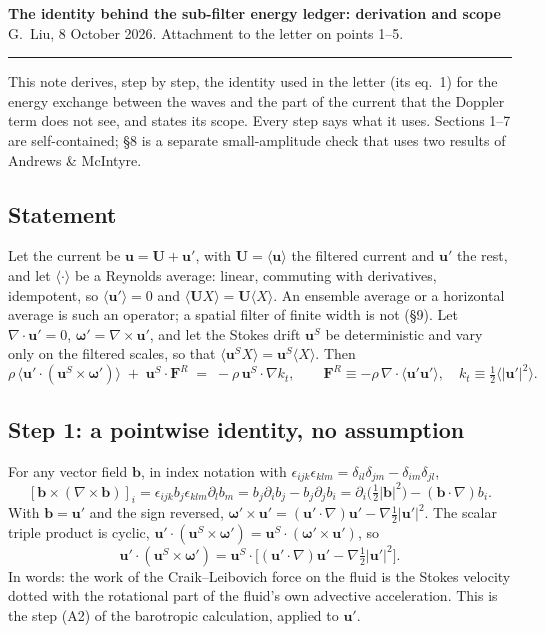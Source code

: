\documentclass[10pt]{article}
\newcommand{\av}[1]{\langle #1\rangle}\newcommand{\uS}{\bm u^S}\newcommand{\WS}{\mathcal W_S}\newcommand{\PS}{\mathcal P_S}
\newcommand{\bu}{\bm u}\newcommand{\bU}{\bm U}\newcommand{\bxi}{\bm\xi}\newcommand{\dd}{\mathrm d}
\begin{document}
\begin{center}{\large\bfseries The identity behind the sub-filter energy ledger: derivation and scope}\\[2pt]
G.~Liu, 8 October 2026. Attachment to the letter on points 1--5.\end{center}
\vspace{-2pt}\rule{\textwidth}{0.4pt}
This note derives, step by step, the identity used in the letter (its eq.~1) for the energy exchange between the waves and the part of the current that the Doppler term does not see, and states its scope. Every step says what it uses. Sections 1--7 are self-contained; \S8 is a separate small-amplitude check that uses two results of Andrews \& McIntyre.

\subsection{Statement}
Let the current be $\bu=\bU+\bu'$, with $\bU=\av{\bu}$ the filtered current and $\bu'$ the rest, and let $\av\cdot$ be a Reynolds average: linear, commuting with derivatives, idempotent, so $\av{\bu'}=0$ and $\av{\bU X}=\bU\av X$. An ensemble average or a horizontal average is such an operator; a spatial filter of finite width is not (\S9). Let $\nabla\cdot\bu'=0$, $\bm\omega'=\nabla\times\bu'$, and let the Stokes drift $\uS$ be deterministic and vary only on the filtered scales, so that $\av{\uS X}=\uS\av X$. Then
\begin{equation}
\rho\,\av{\bu'\cdot(\uS\times\bm\omega')}\;+\;\uS\!\cdot\bm F^R\;=\;-\rho\,\uS\!\cdot\nabla k_t,
\qquad \bm F^R\equiv-\rho\,\nabla\cdot\av{\bu'\bu'},\quad k_t\equiv\tfrac12\av{|\bu'|^2}.
\tag{1}\label{eq:id}
\end{equation}
\setcounter{equation}{1}

\subsection{Step 1: a pointwise identity, no assumption}
For any vector field $\bm b$, in index notation with $\epsilon_{ijk}\epsilon_{klm}=\delta_{il}\delta_{jm}-\delta_{im}\delta_{jl}$,
\[
[\bm b\times(\nabla\times\bm b)]_i=\epsilon_{ijk}b_j\epsilon_{klm}\partial_lb_m=b_j\partial_ib_j-b_j\partial_jb_i
=\partial_i\big(\tfrac12|\bm b|^2\big)-(\bm b\cdot\nabla)b_i .
\]
With $\bm b=\bu'$ and the sign reversed, $\bm\omega'\times\bu'=(\bu'\cdot\nabla)\bu'-\nabla\tfrac12|\bu'|^2$. The scalar triple product is cyclic, $\bu'\cdot(\uS\times\bm\omega')=\uS\cdot(\bm\omega'\times\bu')$, so
\begin{equation}
\bu'\cdot(\uS\times\bm\omega')=\uS\cdot\big[(\bu'\cdot\nabla)\bu'-\nabla\tfrac12|\bu'|^2\big].
\label{eq:s1}
\end{equation}
In words: the work of the Craik--Leibovich force on the fluid is the Stokes velocity dotted with the rotational part of the fluid's own advective acceleration. This is the step (A2) of the barotropic calculation, applied to $\bu'$.
\end{document}
